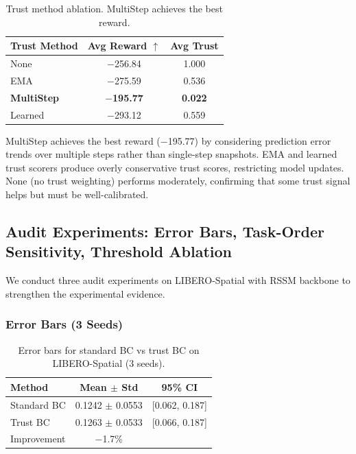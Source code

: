 \documentclass{article}
\begin{document}
\begin{table}[h]
\centering
\caption{Trust method ablation. MultiStep achieves the best reward.}
\label{tab:ablation_trust}
\begin{tabular}{lcc}
\toprule
Trust Method & Avg Reward $\uparrow$ & Avg Trust \\
\midrule
None & $-$256.84 & 1.000 \\
EMA & $-$275.59 & 0.536 \\
\textbf{MultiStep} & \textbf{$-$195.77} & \textbf{0.022} \\
Learned & $-$293.12 & 0.559 \\
\bottomrule
\end{tabular}
\end{table}

MultiStep achieves the best reward ($-$195.77) by considering prediction error trends over multiple steps rather than single-step snapshots. EMA and learned trust scorers produce overly conservative trust scores, restricting model updates. None (no trust weighting) performs moderately, confirming that some trust signal helps but must be well-calibrated.

\subsection{Audit Experiments: Error Bars, Task-Order Sensitivity, Threshold Ablation}

We conduct three audit experiments on LIBERO-Spatial with RSSM backbone to strengthen the experimental evidence.

\subsubsection{Error Bars (3 Seeds)}

\begin{table}[h]
\centering
\caption{Error bars for standard BC vs trust BC on LIBERO-Spatial (3 seeds).}
\label{tab:error_bars}
\begin{tabular}{lcc}
\toprule
Method & Mean $\pm$ Std & 95\% CI \\
\midrule
Standard BC & 0.1242 $\pm$ 0.0553 & [0.062, 0.187] \\
Trust BC & 0.1263 $\pm$ 0.0533 & [0.066, 0.187] \\
\midrule
Improvement & $-$1.7\% & \\
\bottomrule
\end{tabular}
\end{table}
\end{document}
